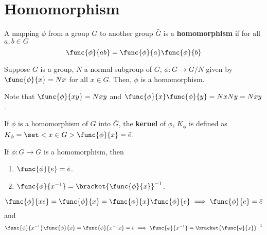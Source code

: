 \section{Homomorphism}
\begin{definition}
    A mapping \(\phi\) from a group \(G\) to another group \(\bar{G}\) is a \textbf{homomorphism} if for all \(a,b \in G\)
    \begin{equation*}
        \func{\phi}{ab} = \func{\phi}{a} \func{\phi}{b}
    \end{equation*}
\end{definition}

\begin{lemma}
    Suppose \(G\) is a group, \(N\) a normal subgroup of \(G\), \(\phi: G \to G/N\) given by \(\func{\phi}{x} = Nx\) for all \(x \in G\). Then, \(\phi\) is a homomorphism.
\end{lemma}

\begin{prooflemma}
    Note that \(\func{\phi}{xy} = Nxy\) and \(\func{\phi}{x} \func{\phi}{y} = NxNy = Nxy\).
\end{prooflemma}

\begin{definition}
    If \(\phi\) is a homomorphism of \(G\) into \(\bar{G}\), the \textbf{kernel} of \(\phi\), \(K_{\phi}\) is defined as \(K_{\phi} = \set<x \in G>{\func{\phi}{x} = \bar{e}}\).
\end{definition}

\begin{lemma}
    If \(\phi: G \to \bar{G}\) is a homomorphism, then  
    \begin{enumerate}
        \item \(\func{\phi}{e} = \bar{e}\).
        \item \(\func{\phi}{x^{-1}} = \bracket{\func{\phi}{x}}^{-1}\).
    \end{enumerate}
\end{lemma}

\begin{prooflemma}
    \begin{equation*}
        \func{\phi}{xe} = \func{\phi}{x} = \func{\phi}{x}\func{\phi}{e} \implies \func{\phi}{e} = \bar{e}
    \end{equation*}
    and 
    \begin{equation*}
        \func{\phi}{x^{-1}} \func{\phi}{x} = \func{\phi}{x^{-1}x} = \bar{e} \implies \func{\phi}{x^{-1}} = \bracket{\func{\phi}{x}}^{-1}
    \end{equation*}
    \
\end{prooflemma}

